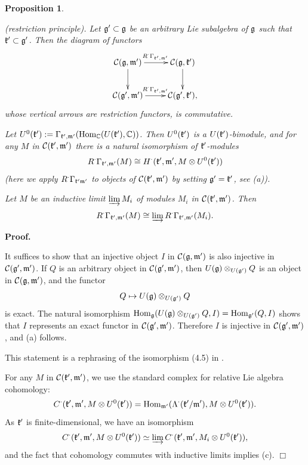 \documentclass[12pt]{article}
\newcounter{theorem}
\newtheorem{prop}[theo]{Proposition}
\newenvironment{proof}{ \textbf{Proof.}}{$\Box$}
\newcommand {\CC} {\mathbb {C}}
\def\Hom{\text{\rm Hom}}
\begin{document}
\begin{prop}\label{prop14}~
\item[(a)] (restriction principle).  Let $\frak g'\subset\frak g$ be an arbitrary Lie subalgebra of $\frak g$ such that $\frak k'\subset \frak g'$.  Then the diagram of functors
\begin{eqnarray*}
\xymatrix{
\mathcal{C} (\frak g, \frak m')\ar[d]\ar[r]^{R^\cdot\Gamma_{\frak k',\frak m'}}& \mathcal{C}(\frak g, \frak k') \ar[d]\\
\mathcal{C} (\frak g', \frak m')\ar[r]^{R^\cdot \Gamma_{\frak k',\frak m'} }& \mathcal{C}(\frak g',\frak k'), }
\end{eqnarray*}
whose vertical arrows are restriction functors, is commutative.
\item[(b)] Let $U^0(\frak k') :=\Gamma_{\frak k',\frak m'} (\Hom_{\CC} (U(\frak k'),\CC))$.  Then $U^0(\frak k')$ is a $U(\frak k')$-bimodule, and for any $M$ in $\mathcal{C} (\frak k',\frak m')$ there is a natural isomorphism of $\frak k'$-modules
$$
R^\cdot \Gamma_{\frak k',\frak m'} (M) \cong H^\cdot (\frak k',\frak m', M\otimes U^0(\frak k'))
$$
(here we apply $R^\cdot\Gamma_{\frak k'\frak m'}$ to objects of $\mathcal{C}(\frak k',\frak m')$ by setting $\frak g' = \frak k'$, see (a)).
\item[(c)] Let $M$ be an inductive limit $\varinjlim M_i$ of modules $M_i$ in $\mathcal{C} (\frak k', \frak m')$.  Then
$$
R^\cdot\Gamma_{\frak k',\frak m'} (M) \cong \varinjlim R^\cdot\Gamma_{\frak k',\frak m'} (M_i).
$$
\end{prop}

\begin{proof}  \item[(a)] It suffices to show that an injective object $I$ in
$\mathcal{C}(\frak g,\frak m')$ is also injective in $\mathcal{C}(\frak g', \frak m')$.  If $Q$ is an arbitrary object in $\mathcal{C}(\frak g', \frak m')$, then $U(\frak g)\otimes_{U(\frak g')} Q$ is an object in $\mathcal{C}(\frak g, \frak m')$, and the functor
$$
Q\mapsto U (\frak g)\otimes_{U (\frak g')} Q
$$
is exact.  The natural isomorphism $\text{Hom}_{\frak g} (U (\frak g)\otimes_{U\overline{} (\frak g')} Q, I)= \text{Hom}_{\frak g'} (Q,I)$ shows that $I$ represents an exact functor in $\mathcal{C}(\frak g',\frak m')$. Therefore $I$ is injective in $\mathcal{C}(\frak g', \frak m')$, and (a) follows.

\item[(b)] This statement is a rephrasing of the isomorphism (4.5) in \cite{EW}.

\item[(c)] For any $M$ in $\mathcal{C} (\frak k',\frak m')$, we use the standard complex for relative Lie algebra cohomology:
$$
C^\cdot (\frak k', \frak m', M\otimes U^0 (\frak k')) = \Hom_{\frak m'} (\Lambda^\cdot (\frak k'/\frak m'), M\otimes U^0 (\frak k')).
$$
As $\frak k'$ is finite-dimensional, we have an isomorphism
$$
C^\cdot(\frak k',\frak m', M\otimes U^0 (\frak k'))\simeq\varinjlim C^\cdot(\frak k',\frak m', M_i\otimes U^0 (\frak k')),
$$
and the fact that cohomology commutes with inductive limits implies (c).
\end{proof}
\end{document}
